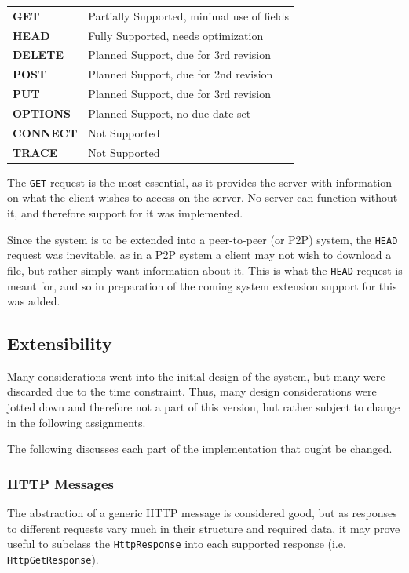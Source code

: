 \documentclass{acm_proc_article-sp}
\newcommand{\code}[1]{{\tt #1}}
\begin{document}
\begin{tabular}{ll}
    {\bf GET}       & Partially Supported, minimal use of fields \\
    {\bf HEAD}      & Fully Supported, needs optimization \\
    {\bf DELETE}    & Planned Support, due for 3rd revision \\
    {\bf POST}      & Planned Support, due for 2nd revision \\
    {\bf PUT}       & Planned Support, due for 3rd revision \\
    {\bf OPTIONS}   & Planned Support, no due date set \\
    {\bf CONNECT}   & Not Supported \\
    {\bf TRACE}     & Not Supported \\
\end{tabular}

The \code{GET} request is the most essential, as it provides the server with
information on what the client wishes to access on the server. No server can
function without it, and therefore support for it was implemented.

Since the system is to be extended into a peer-to-peer (or P2P) system, the
\code{HEAD} request was inevitable, as in a P2P system a client may not wish
to download a file, but rather simply want information about it. This is what
the \code{HEAD} request is meant for, and so in preparation of the coming
system extension support for this was added.

\balancecolumns
\subsection{Extensibility}
\label{sec:design|sub:extensibility}
Many considerations went into the initial design of the system, but many were
discarded due to the time constraint. Thus, many design considerations were
jotted down and therefore not a part of this version, but rather subject to
change in the following assignments.

The following discusses each part of the implementation that ought be changed.

\subsubsection{HTTP Messages}
\label{sec:design|sub:extensibility|sub:http-messages}
The abstraction of a generic HTTP message is considered good, but as responses
to different requests vary much in their structure and required data, it may
prove useful to subclass the \code{HttpResponse} into each supported response
(i.e. \code{HttpGetResponse}).
\end{document}
